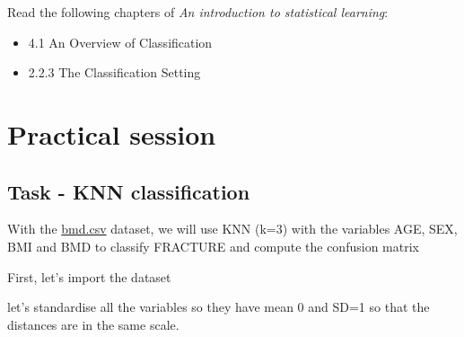 \documentclass[
]{book}
\newenvironment{Shaded}{\begin{snugshade}}{\end{snugshade}}
\newcommand{\AttributeTok}[1]{\textcolor[rgb]{0.13,0.29,0.53}{#1}}
\newcommand{\CommentTok}[1]{\textcolor[rgb]{0.56,0.35,0.01}{\textit{#1}}}
\newcommand{\ConstantTok}[1]{\textcolor[rgb]{0.56,0.35,0.01}{#1}}
\newcommand{\DecValTok}[1]{\textcolor[rgb]{0.00,0.00,0.81}{#1}}
\newcommand{\FunctionTok}[1]{\textcolor[rgb]{0.13,0.29,0.53}{\textbf{#1}}}
\newcommand{\NormalTok}[1]{#1}
\newcommand{\OtherTok}[1]{\textcolor[rgb]{0.56,0.35,0.01}{#1}}
\newcommand{\SpecialCharTok}[1]{\textcolor[rgb]{0.81,0.36,0.00}{\textbf{#1}}}
\newcommand{\StringTok}[1]{\textcolor[rgb]{0.31,0.60,0.02}{#1}}
\providecommand{\tightlist}{%
  \setlength{\itemsep}{0pt}\setlength{\parskip}{0pt}}
\begin{document}
Read the following chapters of \emph{An introduction to statistical learning}:

\begin{itemize}
\tightlist
\item
  4.1 An Overview of Classification
\item
  2.2.3 The Classification Setting
\end{itemize}

\section{Practical session}\label{knnc.prac}

\subsection*{Task - KNN classification}\label{task---knn-classification}

With the \href{https://www.dropbox.com/s/7wjsfdaf0wt2kg2/bmd.csv?dl=1}{bmd.csv}
dataset, we will use KNN (k=3) with the
variables AGE, SEX, BMI and BMD to
classify FRACTURE and compute the confusion matrix

First, let's import the dataset

\begin{Shaded}
\end{Shaded}

let's standardise all the variables so they have mean 0 and SD=1
so that the distances are in the same scale.
\end{document}
